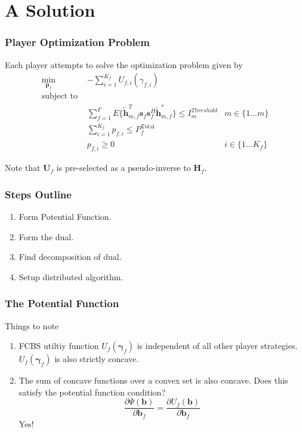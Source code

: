 \documentclass[10pt,tgadventor, onlymath]{beamer}
\begin{document}
\section{A Solution}
\begin{frame}
\frametitle{Player Optimization Problem}
Each player attempts to solve the optimization problem given by 
	\begin{subequations}
	\begin{align}
	    \underset{\mathbf{p}_{f} }{\text{min}} \;
	    & - \sum_{i=1}^{K_f}
    	U_{f,i}(\gamma_{f,i}) \label{player_opt_c} \\
	    \text{subject to  }\\
	  &
	  \sum^F_{f=1} E\{ \mathbf{\tilde{h}}_{m,f}^T  \mathbf{s}_{f} 						
	\mathbf{s}_{f}^{H} \mathbf{\tilde{h}}_{m,f}^* \}
	\leq I^{Threshold}		
	_{m} & m \in \{1 ...m\} 
		\label{interference_const_c}\\
        & 
        	\sum_{i=1}^{K_{f}} p_{f,i}
	   \leq P_{f}^{\text{Total}}  \label{power_const_c}\\
        & p_{f,i} \geq 0 &  i\in \{1 ...K_{f}\} \label{pos_power_const_c}
	\end{align}
	\end{subequations}

Note that $\mathbf{U}_{f}$ is pre-selected as a pseudo-inverse to  $\mathbf{H}_f$.
\end{frame}


\begin{frame}
\frametitle{Steps Outline}
\begin{enumerate}
\setlength\itemsep{2em}

\item
	Form Potential Function.
\item 
	Form the dual.
\item 
	Find decomposition of dual.
\item
	Setup distributed algorithm.
\end{enumerate}
\end{frame}

\begin{frame}
\frametitle{The Potential Function}
Things to note
\begin{enumerate}
\item
	FCBS utiltiy function $U_{f}(\boldsymbol{\gamma}_{f})$ is independent of all other player strategies. 
	$U_{f}(\boldsymbol{\gamma}_{f})$ is also strictly concave.
\item
	The sum of concave functions over a convex set is also concave. Does this satisfy the potential function 			condition?
	\begin{equation*}\label{potential_game_condition}
\frac{\partial \Psi(\mathbf{b})}{\partial \mathbf{b}_{f}}
 =
 \frac{\partial U_f(\mathbf{b})}{\partial \mathbf{b}_{f}}
\end{equation*} 
Yes!
\end{enumerate}

\end{frame}
\end{document}
